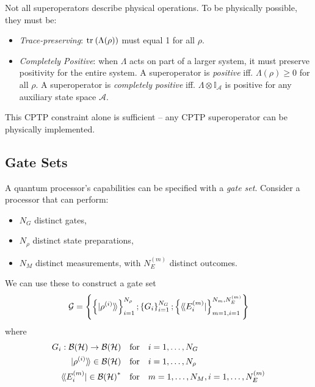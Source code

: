 Not all superoperators describe physical operations. To be physically possible, they must be:
\begin{itemize}
    \item \textit{Trace-preserving}: $\text{tr}_{}\left(\Lambda(\rho)\right)$ must equal 1 for all $\rho$.
    \item \textit{Completely Positive}: when $\Lambda$ acts on part of a larger system, it must
    preserve positivity for the entire system. A superoperator is \textit{positive} iff.
    $\Lambda(\rho) \ge 0$ for all $\rho$. A superoperator is \textit{completely positive} iff.
    $\Lambda \otimes \mathbb{I}_{\mathcal{A}}$ is positive for any auxiliary state space
    $\mathcal{A}$.
\end{itemize}
This \ac{CPTP} constraint alone is sufficient -- any \ac{CPTP} superoperator can be physically
implemented. 


\subsection{Gate Sets}

A quantum processor's capabilities can be specified with a \textit{gate set}. Consider a processor
that can perform:
\begin{itemize}
    \item $N_G$ distinct gates,
    \item $N_{\rho}$ distinct state preparations,
    \item $N_M$ distinct measurements, with $N_E^{(m)}$ distinct outcomes.
\end{itemize}
We can use these to construct a gate set
\begin{equation}
    \mathcal{G} = 
    \left\{
        \left\{
            \ket{\rho^{(i)}}\!\rangle
        \right\}^{N_{\rho}}_{i=1} ;
        \left\{
            G_i
        \right\}^{N_G}_{i=1} ;
        \left\{
            \langle\!\bra{E_i^{(m)}}
        \right\}^{N_m, N_E^{(m)}}_{m=1, i=1}
    \right\}
\end{equation}
where
\begin{equation}
    \begin{aligned}
        G_i : \mathcal{B(H)} \to \mathcal{B(H)}  \quad &\text{for} \quad i = 1, \dots, N_G \\
        \ket{\rho^{(i)}}\!\rangle \in \mathcal{B(H)} \quad &\text{for} \quad i = 1, \dots, N_{\rho} \\
        \langle\!\bra{E_i^{(m)}} \in \mathcal{B(H)}^*  \quad &\text{for} \quad m = 1, \dots, N_M, i = 1, \dots, N_E^{(m)} \\
    \end{aligned}
\end{equation}

